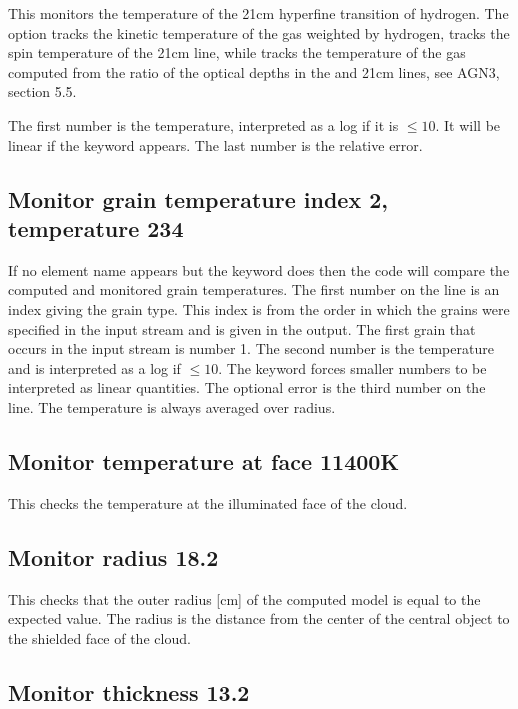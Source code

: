 This monitors the temperature of the 21cm hyperfine transition of hydrogen.
The  option tracks the kinetic temperature of the gas
weighted by hydrogen,  tracks the spin temperature of the 21cm line,
while  tracks the temperature of the gas computed from the ratio
of the optical depths in the \la{} and 21cm lines, see AGN3, section 5.5.

The first number is the temperature, interpreted as a log if
it is $\le 10$.
It will be linear if the keyword  appears.
The last number is the relative error.

\subsection{Monitor grain temperature index 2, temperature  234}

If no element name appears but the keyword 
does then the code
will compare the computed and monitored grain temperatures.
The first number
on the line is an index giving the grain type.
This index is from the order
in which the grains were specified in the input stream and
is given in the output.
The first grain that occurs in the input stream is number 1.
The
second number is the temperature and is interpreted as a
log if $\le 10$.
The
 keyword forces smaller numbers to be
interpreted as linear quantities.
The optional error is the third number on the line.
The temperature is
always averaged over radius.

\subsection{Monitor temperature at face 11400K}

This checks the temperature at the illuminated face of the cloud.

\subsection{Monitor radius 18.2}

This checks that the outer radius [cm] of the computed model is equal
to the expected value.
The radius is the distance from the center of the
central object to the shielded face of the cloud.

\subsection{Monitor thickness 13.2}

